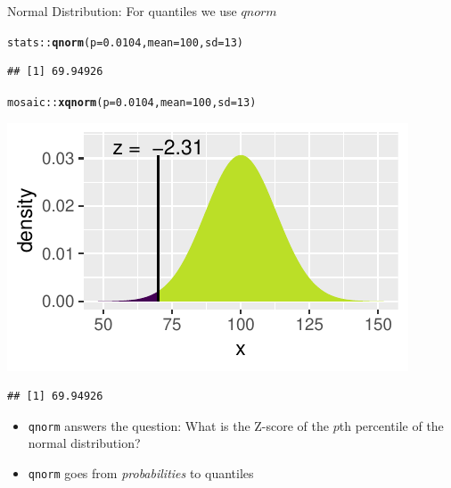 \documentclass{beamer}\usepackage[]{graphicx}\usepackage[]{color}
\newcommand{\hlnum}[1]{\textcolor[rgb]{0.686,0.059,0.569}{#1}}%
\newcommand{\hlopt}[1]{\textcolor[rgb]{0,0,0}{#1}}%
\newcommand{\hlstd}[1]{\textcolor[rgb]{0.345,0.345,0.345}{#1}}%
\newcommand{\hlkwc}[1]{\textcolor[rgb]{0.333,0.667,0.333}{#1}}%
\newcommand{\hlkwd}[1]{\textcolor[rgb]{0.737,0.353,0.396}{\textbf{#1}}}%
\newenvironment{knitrout}{}{} %
\begin{document}
\begin{frame}[fragile]{Normal Distribution: For quantiles we use $qnorm$}



\begin{knitrout}\scriptsize
{}\color{fgcolor}
\begin{alltt}
\hlstd{stats}\hlopt{::}\hlkwd{qnorm}\hlstd{(}\hlkwc{p} \hlstd{=} \hlnum{0.0104}\hlstd{,} \hlkwc{mean} \hlstd{=} \hlnum{100}\hlstd{,} \hlkwc{sd} \hlstd{=} \hlnum{13}\hlstd{)}
\end{alltt}
\begin{verbatim}
## [1] 69.94926
\end{verbatim}

\end{knitrout}

 

\begin{knitrout}\scriptsize
{}\color{fgcolor}
\begin{alltt}
\hlstd{mosaic}\hlopt{::}\hlkwd{xqnorm}\hlstd{(}\hlkwc{p} \hlstd{=} \hlnum{0.0104}\hlstd{,} \hlkwc{mean} \hlstd{=} \hlnum{100}\hlstd{,} \hlkwc{sd} \hlstd{=} \hlnum{13}\hlstd{)}
\end{alltt}


{\centering \includegraphics[width=0.6\linewidth]{figure/probs5-1} 

}


\begin{verbatim}
## [1] 69.94926
\end{verbatim}

\end{knitrout}



\small{
\begin{itemize}
	\item \texttt{qnorm} answers the question: What is the Z-score of the $p$th percentile of the normal distribution?
	
	\item \texttt{qnorm} goes from \textit{probabilities} to quantiles 
\end{itemize}
}
\end{frame}
\end{document}
